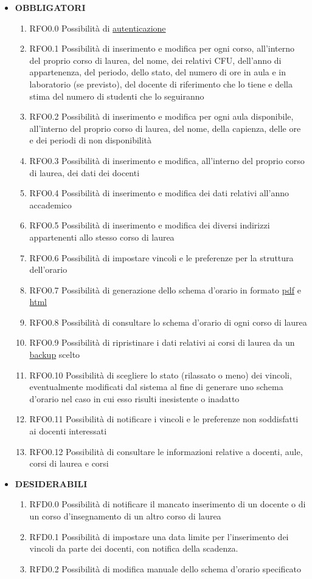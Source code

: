 \documentclass[11pt,a4paper]{article}
\begin{document}
\begin{itemize}
\item \textbf{OBBLIGATORI}
\begin{enumerate}
\item RFO0.0 Possibilità di \underline{autenticazione}
\item RFO0.1 Possibilità di inserimento e modifica per ogni corso, all'interno del proprio corso di laurea, del nome, dei relativi CFU, dell'anno di appartenenza, del periodo, dello stato, del numero di ore in aula e in laboratorio (se previsto), del docente di riferimento che lo tiene e della stima del numero di studenti che lo seguiranno 
\item RFO0.2 Possibilità di inserimento e modifica per ogni aula disponibile, all'interno del proprio corso di laurea, del nome, della capienza, delle ore e dei periodi di non disponibilità
\item RFO0.3 Possibilità di inserimento e modifica, all'interno del proprio corso di laurea, dei dati dei docenti
\item RFO0.4 Possibilità di inserimento e modifica dei dati relativi all'anno accademico
\item RFO0.5 Possibilità di inserimento e modifica dei diversi indirizzi appartenenti allo stesso corso di laurea
\item RFO0.6 Possibilità di impostare vincoli e le preferenze per la struttura dell'orario
\item RFO0.7 Possibilità di generazione dello schema d'orario in formato \underline{pdf} e \underline{html}
\item RFO0.8 Possibilità di consultare lo schema d'orario di ogni corso di laurea
\item RFO0.9 Possibilità di ripristinare i dati relativi ai corsi di laurea da un \underline{backup} scelto
\item RFO0.10 Possibilità di scegliere lo stato (rilassato o meno) dei vincoli, eventualmente modificati dal sistema al fine di generare uno schema d'orario nel caso in cui esso risulti inesistente o inadatto
\item RFO0.11 Possibilità di notificare i vincoli e le preferenze non soddisfatti ai docenti interessati
\item RFO0.12 Possibilità di consultare le informazioni relative a docenti, aule, corsi di laurea e corsi
\end{enumerate}
\item \textbf{DESIDERABILI}
\begin{enumerate}
\item RFD0.0 Possibilità di notificare il mancato inserimento di un docente o di un corso d'insegnamento di un altro corso di laurea
\item RFD0.1 Possibilità di impostare una data limite per l'inserimento dei vincoli da parte dei docenti, con notifica della scadenza. 
\item RFD0.2 Possibilità di modifica manuale dello schema d'orario specificato
\end{enumerate}
\end{itemize}
\end{document}
